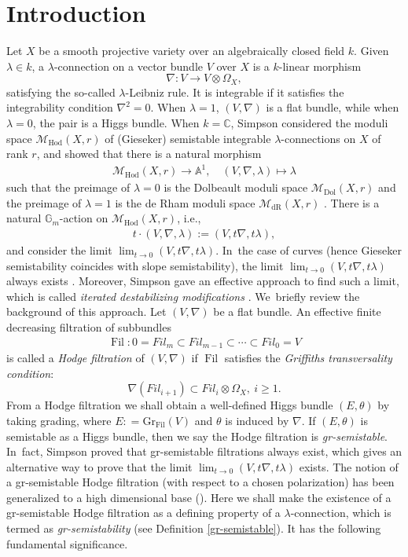 \documentclass[11pt]{article}
\newcommand{\ie}{i.e.,\xspace}
\numberwithin{equation}{section}
\newcommand{\Fil}{\textit{Fil}}
\newcommand{\lconnection}{$\lambda$\nobreakdash-con\-nec\-tion\xspace}
\newcommand{\lconnections}{$\lambda$\nobreakdash-con\-nec\-tions\xspace}
\newcommand{\grsemistable}{gr\nobreakdash-semi\-stable\xspace}
\newcommand{\Dol}{\mathrm{Dol}}
\newcommand{\dR}{\mathrm{dR}}
\newcommand{\Hod}{\mathrm{Hod}}
\DeclareMathOperator{\Filt}{Fil}
\newcommand{\Gr}{\mathrm{Gr}}
\theoremstyle{plain}
\theoremstyle{definition}
\begin{document}
\section{Introduction}

Let $X$ be a smooth projective variety over an algebraically closed field $k$. Given $\lambda \in k$, a \lconnection on a vector bundle $V$ over $X$ is a $k$-linear morphism
\[
\nabla: V \to V \otimes \Omega_X,
\]
satisfying the so-called $\lambda$-Leibniz rule. It is integrable if it satisfies the integrability condition $\nabla^2=0$. When $\lambda=1$, $(V,\nabla)$ is a flat bundle, while when $\lambda=0$, the pair is a Higgs bundle. When $k=\mathbb{C}$, Simpson considered the moduli space $\mathcal{M}_\Hod(X,r)$ of (Gieseker) semistable integrable \lconnections on $X$ of rank $r$, and showed that there is a natural morphism
\begin{align*}
\mathcal{M}_\Hod(X,r) \to \mathbb{A}^1, \quad (V,\nabla,\lambda) \mapsto \lambda
\end{align*}
such that the preimage of $\lambda=0$ is the Dolbeault moduli space $\mathcal{M}_\Dol(X,r)$ and the preimage of $\lambda=1$ is the de Rham moduli space $\mathcal{M}_\dR(X,r)$ \cite[Prop.\,4.1]{Si97}. There is a natural $\mathbb{G}_m$-action on $\mathcal{M}_\Hod(X,r)$, \ie
\begin{align*}
t \cdot (V,\nabla,\lambda) := (V, t\nabla, t\lambda),
\end{align*}
and consider the limit $\lim_{t \to 0} (V, t\nabla, t\lambda)$. In~the case of curves (hence Gieseker semistability coincides with slope semistability), the limit $\lim_{t \to 0} (V, t\nabla, t\lambda)$ always exists \cite[Lem.\,4.1]{S10}. Moreover, Simpson gave an effective approach to find such a limit, which is called \emph{iterated destabilizing modifications} \cite{S10}. We~briefly review the background of this approach. Let $(V,\nabla)$ be a flat bundle. An effective finite decreasing filtration of subbundles
\begin{align*}
\Filt: 0=\Fil_m \subset \Fil_{m-1} \subset \cdots \subset \Fil_0=V
\end{align*}
is called a \emph{Hodge filtration} of $(V,\nabla)$ if $\Filt$ satisfies the \emph{Griffiths transversality condition}:
\[
\nabla(\Fil_{i+1})\subset \Fil_{i}\otimes \Omega_X, \ i \geq 1.
\]
From a Hodge filtration we shall obtain a well-defined Higgs bundle $(E,\theta)$ by taking grading, where $E: = \Gr_{\Filt}(V)$ and $\theta$ is induced by $\nabla$. If $(E,\theta)$ is semistable as a Higgs bundle, then we say the Hodge filtration is \emph{\grsemistable}. In~fact, Simpson proved that \grsemistable filtrations always exist, which gives an alternative way to prove that the limit $\lim_{t \to 0} (V, t\nabla, t\lambda)$ exists. The notion of a \grsemistable Hodge filtration (with respect to a chosen polarization) has been generalized to a high dimensional base (\cite{LSZ19,L13}). Here we shall make the existence of a \grsemistable Hodge filtration as a defining property of a \lconnection, which is termed as \emph{gr-semistability} (see Definition \ref{gr-semistable}). It has the following fundamental significance.
\end{document}

